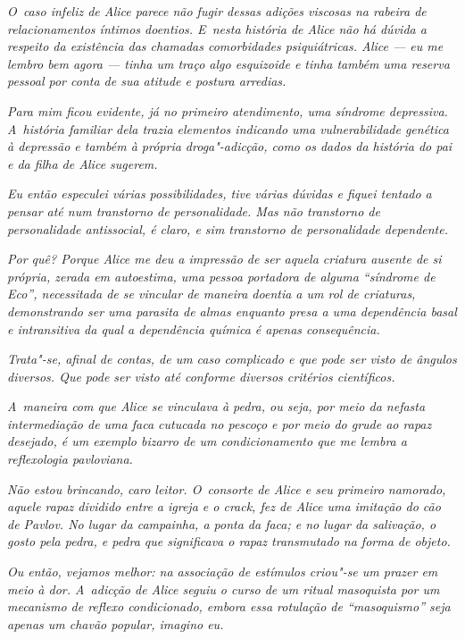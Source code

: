 \emph{O~caso infeliz de Alice parece não fugir dessas adições viscosas
na rabeira de relacionamentos íntimos doentios. E~nesta história de
Alice não há dúvida a respeito da existência das chamadas comorbidades
psiquiátricas. Alice --- eu me lembro bem agora --- tinha um traço algo
esquizoide e tinha também uma reserva pessoal por conta de sua atitude e
postura arredias.}

\emph{Para mim ficou evidente, já no primeiro atendimento, uma síndrome
depressiva. A~história familiar dela trazia elementos indicando uma
vulnerabilidade genética à depressão e também à própria droga"-adicção,
como os dados da história do pai e da filha de Alice sugerem.}

\emph{Eu então especulei várias possibilidades, tive várias dúvidas e
fiquei tentado a pensar até num transtorno de personalidade. Mas não
transtorno de personalidade antissocial, é claro, e sim transtorno de
personalidade dependente.}

\emph{Por quê? Porque Alice me deu a impressão de ser aquela criatura
ausente de si própria, zerada em autoestima, uma pessoa portadora de
alguma ``síndrome de Eco'', necessitada de se vincular de maneira
doentia a um rol de criaturas, demonstrando ser uma parasita de almas
enquanto presa a uma dependência basal e intransitiva da qual a
dependência química é apenas consequência.}

\emph{Trata"-se, afinal de contas, de um caso complicado e que pode ser
visto de ângulos diversos. Que pode ser visto até conforme diversos
critérios científicos.}

\emph{A~maneira com que Alice se vinculava à pedra, ou seja, por meio da
nefasta intermediação de uma faca cutucada no pescoço e por meio do
grude ao rapaz desejado, é um exemplo bizarro de um condicionamento que
me lembra a reflexologia pavloviana.}

\emph{Não estou brincando, caro leitor. O~consorte de Alice e seu
primeiro namorado, aquele rapaz dividido entre a igreja e o crack, fez
de Alice uma imitação do cão de Pavlov. No lugar da campainha, a ponta
da faca; e no lugar da salivação, o gosto pela pedra, e pedra que
significava o rapaz transmutado na forma de objeto.}

\emph{Ou então, vejamos melhor: na associação de estímulos criou"-se um
prazer em meio à dor. A~adicção de Alice seguiu o curso de um ritual
masoquista por um mecanismo de reflexo condicionado, embora essa
rotulação de ``masoquismo'' seja apenas um chavão popular, imagino eu.}

